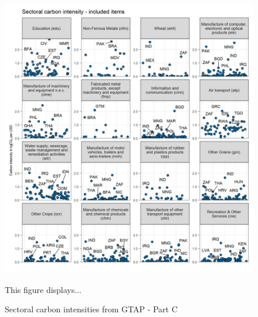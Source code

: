 \documentclass[12pt, a4paper]{article}
\newenvironment{subcaption}
{\strut
\vspace{-5pt}
\begin{minipage}[b]{0.9\textwidth}
  \hspace*{-\parindent}
  \footnotesize}
 {\end{minipage}}
\begin{document}
\begin{figure}[ht!]
  \centering
  \caption{Sectoral carbon intensities from GTAP - Part C} \label{fig:B3}
  \includegraphics{Analysis_Carbon_Intensities_GTAP/Figure_2.1.1_C}
  \begin{subcaption}
    This figure displays...
  \end{subcaption}

\end{figure}

\clearpage
\end{document}
